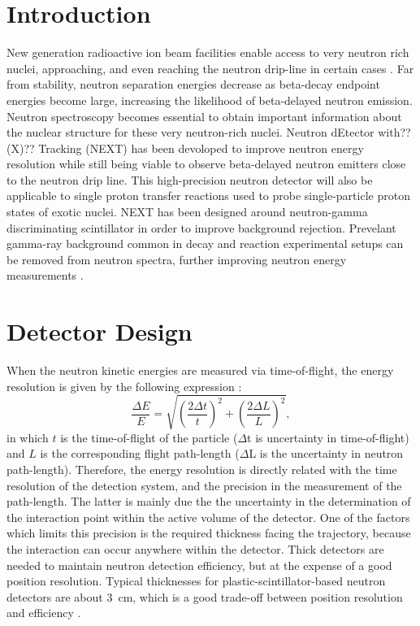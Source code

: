 \documentclass[preprint,3p,twocolumn]{elsarticle}
\begin{document}
\linenumbers

\section{Introduction}
New generation radioactive ion beam facilities enable access to very neutron rich nuclei, approaching, and even reaching the neutron drip-line in certain
cases \cite{FRIB}.
Far from stability, neutron separation energies decrease as beta-decay endpoint energies become large, increasing the likelihood of beta-delayed neutron emission. Neutron spectroscopy becomes essential to obtain important information about the nuclear structure for these very neutron-rich nuclei. 
Neutron dEtector with??(X)?? Tracking (NEXT) has been devoloped to improve neutron energy resolution while still being viable to observe beta-delayed neutron emitters close to the neutron drip line. 
This high-precision neutron detector will also be applicable to single proton transfer reactions used to probe single-particle proton states of exotic nuclei. NEXT has been designed around neutron-gamma discriminating scintillator in order to improve background rejection. Prevelant gamma-ray background common in decay and reaction experimental setups can be removed from neutron spectra, further improving neutron energy measurements \cite{FEBBRARO2018189}.

\section{ Detector Design}

When the neutron kinetic energies are measured via time-of-flight, the energy resolution is given by the following expression \cite{KORNILOV2009226}:
\begin{equation}
\frac{\Delta E}{E}=\sqrt{\left(\frac{2\Delta t}{t}\right )^2+\left(\frac{2\Delta L}{L}\right )^2},
\label{eq:resolution}
\end{equation}
in which $t$  is the time-of-flight of the particle ($\Delta$t is uncertainty in time-of-flight) and $L$ is the corresponding flight path-length ($\Delta$L is the uncertainty in neutron path-length). Therefore, the energy resolution is directly related with the time resolution of the detection system, and the precision in the measurement of the path-length. The latter is mainly due the the uncertainty in the determination of the interaction point within the active volume of the detector. One of the factors which limits this precision is the required thickness facing the trajectory, because the interaction can occur anywhere within the detector. Thick detectors are needed to maintain neutron detection efficiency, but at the expense of a good position resolution. Typical thicknesses for plastic-scintillator-based neutron detectors are about 3~cm, which is a good trade-off between position resolution and efficiency \cite{PETERS2016122,BUTA2000412}.
\end{document}
